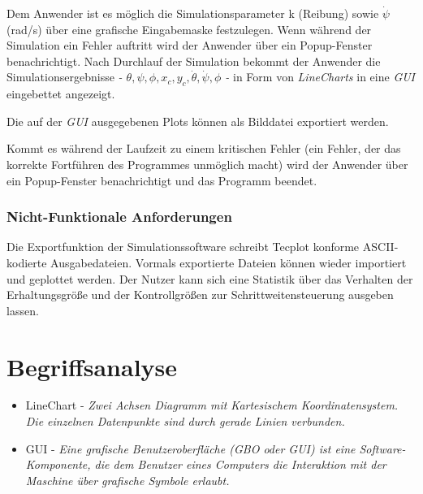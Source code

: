 {Dem Anwender ist es m\"oglich die Simulationsparameter k (Reibung) sowie 
$ \dot \psi $ (rad/s) \"uber eine grafische Eingabemaske festzulegen. 
Wenn w\"ahrend der Simulation ein Fehler auftritt wird der Anwender 
\"uber ein Popup-Fenster benachrichtigt. Nach Durchlauf der Simulation
bekommt der Anwender die Simulationsergebnisse 
\textit{ - $\theta, \psi, \phi, x_c, y_c, \dot \theta, \dot \psi, 
\phi$ -} in Form von \textit{LineCharts} in eine \textit{GUI} 
eingebettet angezeigt.} 

Die auf der \textit{GUI} ausgegebenen Plots k\"onnen als Bilddatei exportiert werden. \medskip

Kommt es w\"ahrend der Laufzeit zu einem kritischen Fehler (ein Fehler, der das korrekte Fortf\"uhren des Programmes unm\"oglich macht) wird der Anwender \"uber ein Popup-Fenster benachrichtigt und das Programm beendet.
\medskip

\subsubsection{Nicht-Funktionale Anforderungen}
{
Die Exportfunktion der Simulationssoftware schreibt Tecplot konforme ASCII-kodierte Ausgabedateien.
Vormals exportierte Dateien k\"onnen wieder importiert und geplottet werden.
Der Nutzer kann sich eine Statistik \"uber das Verhalten der Erhaltungsgr\"o\ss e und der Kontrollgr\"o\ss en zur Schrittweitensteuerung ausgeben lassen.  
}



\section{Begriffsanalyse}
\begin{itemize}
\item LineChart - \textit{Zwei Achsen Diagramm mit Kartesischem Koordinatensystem. Die einzelnen Datenpunkte sind durch gerade Linien verbunden.} 
\item GUI - \textit{Eine grafische Benutzeroberfl\"ache (GBO oder GUI) ist eine Software-Komponente, die dem Benutzer eines Computers die Interaktion mit der Maschine über grafische Symbole erlaubt.} 
\end{itemize}




